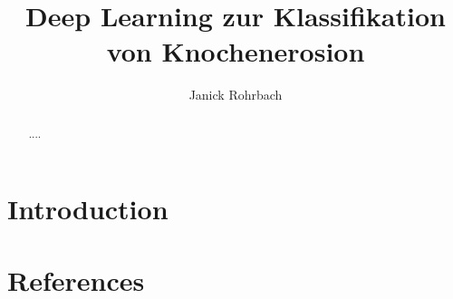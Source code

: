 \documentclass[11pt]{article}
\begin{document}
\title{Deep Learning zur Klassifikation von Knochenerosion}
\author{Janick Rohrbach}
\maketitle

\newpage
	
\begin{abstract}
....
\end{abstract}

\newpage

\section{Introduction}
\label{sec:intro}




\newpage
\section*{References}


\end{document}
